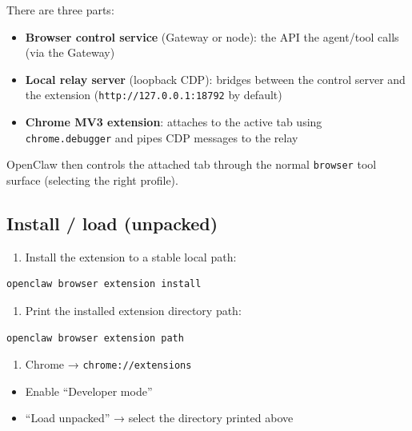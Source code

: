 There are three parts:

\begin{itemize}
  \item \textbf{Browser control service} (Gateway or node): the API the agent/tool calls (via the Gateway)
  \item \textbf{Local relay server} (loopback CDP): bridges between the control server and the extension (\texttt{http://127.0.0.1:18792} by default)
  \item \textbf{Chrome MV3 extension}: attaches to the active tab using \texttt{chrome.debugger} and pipes CDP messages to the relay
\end{itemize}


OpenClaw then controls the attached tab through the normal \texttt{browser} tool surface (selecting the right profile).

\subsection{Install / load (unpacked)}


\begin{enumerate}
  \item Install the extension to a stable local path:
\end{enumerate}


\begin{lstlisting}[language=bash]
openclaw browser extension install
\end{lstlisting}


\begin{enumerate}
  \item Print the installed extension directory path:
\end{enumerate}


\begin{lstlisting}[language=bash]
openclaw browser extension path
\end{lstlisting}


\begin{enumerate}
  \item Chrome → \texttt{chrome://extensions}
\end{enumerate}


\begin{itemize}
  \item Enable “Developer mode”
  \item “Load unpacked” → select the directory printed above
\end{itemize}


